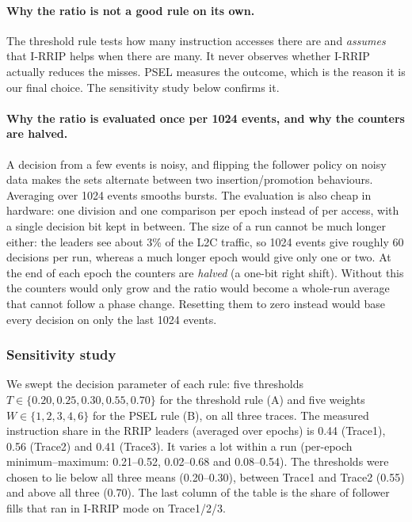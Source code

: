 \documentclass[11pt,a4paper]{article}
\begin{document}
\paragraph{Why the ratio is not a good rule on its own.} The threshold rule tests how many instruction accesses there are
and \emph{assumes} that I-RRIP helps when there are many. It never observes whether I-RRIP actually reduces the misses.
PSEL measures the outcome, which is the reason it is our final choice. The sensitivity study below confirms it.

\paragraph{Why the ratio is evaluated once per 1024 events, and why the counters are halved.}
A decision from a few events is noisy, and flipping the follower policy on noisy data makes the sets alternate between two
insertion/promotion behaviours. Averaging over 1024 events smooths bursts. The evaluation is also cheap in hardware:
one division and one comparison per epoch instead of per access, with a single decision bit kept in between.
The size of a run cannot be much longer either: the leaders see about 3\% of the L2C traffic, so 1024 events give roughly 60 decisions
per run, whereas a much longer epoch would give only one or two.
At the end of each epoch the counters are \emph{halved} (a one-bit right shift). Without this the counters would only
grow and the ratio would become a whole-run average that cannot follow a phase change. Resetting them to zero instead
would base every decision on only the last 1024 events.

\subsubsection{Sensitivity study}

We swept the decision parameter of each rule: five thresholds $T \in \{0.20, 0.25, 0.30, 0.55, 0.70\}$ for the
threshold rule (A) and five weights $W \in \{1, 2, 3, 4, 6\}$ for the PSEL rule (B), on all three traces.
The measured instruction share in the RRIP leaders (averaged over epochs) is 0.44 (Trace1), 0.56 (Trace2) and 0.41 (Trace3).
It varies a lot within a run (per-epoch minimum--maximum: 0.21--0.52, 0.02--0.68 and 0.08--0.54).
The thresholds were chosen to lie below all three means (0.20--0.30), between Trace1 and Trace2 (0.55)
and above all three (0.70). The last column of the table is the share of follower fills that ran in I-RRIP mode on Trace1/2/3.
\end{document}
